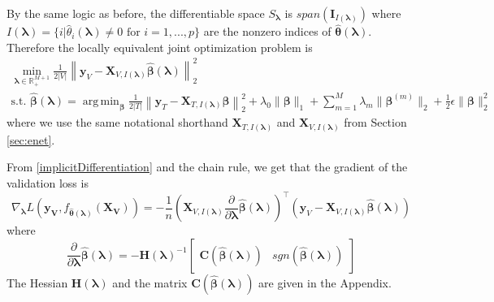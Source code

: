 \documentclass[12pt]{article}
\DeclareMathOperator*{\argmin}{arg\,min}
\begin{document}
By the same logic as before, the differentiable space $S_{\boldsymbol \lambda}$ is $span(\boldsymbol I_{I(\boldsymbol\lambda)})$ where $I(\boldsymbol\lambda) = \{i | \hat{\theta}_i(\boldsymbol\lambda) \ne 0 \text{ for } i=1,...,p \}$ are the nonzero indices of $\hat{\boldsymbol{\theta}}(\boldsymbol{\lambda})$. Therefore the locally equivalent joint optimization problem is
\begin{equation}
\begin{array}{c}
\min_{\boldsymbol{\lambda} \in \mathbb{R}^{M+1}_{+}} \frac{1}{2|V|} \left \| \boldsymbol{y}_V - \boldsymbol X_{V,I(\boldsymbol\lambda)} \hat{\boldsymbol\beta}(\boldsymbol{\lambda}) \right \|^2_2 \\
\text{s.t. }
\hat{\boldsymbol{\beta}}(\boldsymbol{\lambda}) = \argmin_{\boldsymbol \beta}
\frac{1}{2|T|} \left \| \boldsymbol{y}_T - \boldsymbol{X}_{T, I(\boldsymbol\lambda)} \boldsymbol \beta \right \|^2_2
+ \lambda_0 \| \boldsymbol \beta \|_1
+ \sum_{m=1}^M \lambda_m \| \boldsymbol \beta^{(m)} \|_2
+ \frac{1}{2}\epsilon \| \boldsymbol \beta \|_2^2
\end{array}
\end{equation}
where we use the same notational shorthand $\boldsymbol{X}_{T, I(\boldsymbol\lambda)}$ and $\boldsymbol{X}_{V, I(\boldsymbol\lambda)}$ from Section \ref{sec:enet}.

From \eqref{implicitDifferentiation} and the chain rule, we get that the gradient of the validation loss is
\begin{equation}
\nabla_{\boldsymbol \lambda} L(\boldsymbol{y_V}, f_{\hat{\boldsymbol{\theta}}(\boldsymbol{\lambda})}(\boldsymbol{X_V})) =
- \frac{1}{n}
\left (
\boldsymbol{X}_{V, I(\boldsymbol\lambda)}
\frac{\partial}{\partial \boldsymbol\lambda} \hat{\boldsymbol{\beta}}(\boldsymbol{\lambda})
\right )^\top
\left (
\boldsymbol{y}_V - \boldsymbol{X}_{V, I(\boldsymbol\lambda)} \hat{\boldsymbol{\beta}}(\boldsymbol{\lambda})
\right )
\end{equation}
where 
\begin{equation}
\frac{\partial}{\partial \boldsymbol \lambda} \hat{\boldsymbol{\beta}}(\boldsymbol{\lambda})
=
- \boldsymbol H(\boldsymbol \lambda)^{-1}
\begin{bmatrix}
\boldsymbol C(\hat{\boldsymbol \beta}(\boldsymbol \lambda)) & sgn(\hat {\boldsymbol \beta}(\boldsymbol \lambda))
\end{bmatrix}
\label{eq:unpooled_sgl_grad}
\end{equation}
The Hessian $\boldsymbol H(\boldsymbol \lambda)$ and the matrix $\boldsymbol C(\hat{\boldsymbol \beta}(\boldsymbol \lambda))$ are given in the Appendix.
\end{document}
